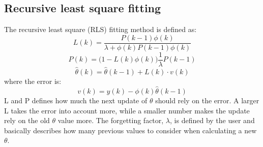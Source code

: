 \subsection{Recursive least square fitting}
The recursive least square (RLS) fitting method is defined as:
\begin{equation}
	L(k) =\dfrac{ P(k-1)\phi (k)}{\lambda + \phi (k) P(k-1)\phi(k)} 
\label{eq:RLS1}
\end{equation}
\begin{equation}
	P(k) = \Big( 1 - L(k)\phi (k) \Big) \dfrac{1}{\lambda} P(k-1)
\label{eq:RLS2}
\end{equation}
\begin{equation}
\hat \theta (k) = \hat \theta (k-1) + L(k) \cdot v(k)
\label{eq:RLS3}
\end{equation}
where the error is:
\begin{equation}
	v(k) = y(k) - \phi (k) \hat \theta (k-1)
	\label{eq:RLS4}
\end{equation}
L and P defines how much the next update of $ \theta $ should rely on the error. A larger L takes the error into account more, while a smaller number makes the update rely on the old $ \theta $ value more. The forgetting factor, $ \lambda $, is defined by the user and basically describes how many previous values to consider when calculating a new $ \theta $.


